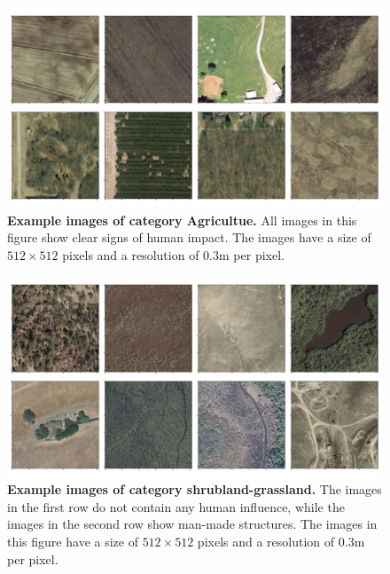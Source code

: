 \begin{figure}[h!]
	\centering
	\captionsetup{width=1\linewidth}
	\includegraphics[width=1\textwidth]{Figures/agriculture_sample.pdf}
	\caption{\textbf{Example images of category Agricultue.} All images in this figure show clear signs of human impact. The images have a size of $512\times512$ pixels and a resolution of $0.3$m per pixel.}
	\label{fig:agriculture_sample}
\end{figure}

\begin{figure}[h!]
	\centering
	\captionsetup{width=1\linewidth}
	\includegraphics[width=1\textwidth]{Figures/shrubland-grassland_sample.pdf}
	\caption{\textbf{Example images of category shrubland-grassland.} The images in the first row do not contain any human influence, while the images in the second row show man-made structures. The images in this figure have a size of $512\times512$ pixels and a resolution of $0.3$m per pixel.}
	\label{fig:shrubland-sample}
\end{figure}

